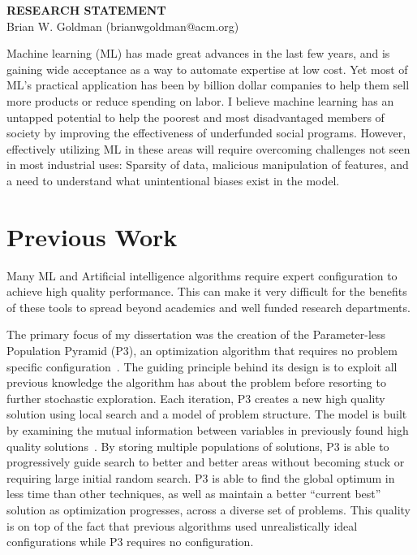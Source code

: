 \documentclass[a4paper, 11pt]{article}
\begin{document}
\thispagestyle{empty}

\pagestyle{fancy}

\begin{center}
{\LARGE \bf RESEARCH STATEMENT}\\
\vspace*{0.1cm}
{\normalsize Brian W. Goldman (brianwgoldman@acm.org)}
\end{center}

\noindent
Machine learning (ML) has made great advances in the last few years, and is gaining wide
acceptance as a way to automate expertise at low cost. Yet most of ML's practical application has
been by billion dollar companies to help them sell more products or reduce spending on labor.
I believe machine learning has an untapped potential to help the poorest and most disadvantaged members
of society by improving the effectiveness of underfunded social programs. However, effectively utilizing
ML in these areas will require overcoming challenges not seen in most industrial uses: Sparsity of data,
malicious manipulation of features, and a need to understand what unintentional biases exist in the model.




\section{Previous Work}
Many ML and Artificial intelligence algorithms require expert configuration
to achieve high quality performance. This can make it very difficult for
the benefits of these tools to spread beyond academics and well funded
research departments.

The primary focus of my dissertation was the creation of the
Parameter-less Population Pyramid (P3), an optimization algorithm
that requires no problem specific configuration~\cite{goldman:2014:p3,goldman:2015:fastp3,goldman:2016:p3hiff}.
The guiding principle behind its design is to exploit all previous
knowledge the algorithm has about the problem before resorting to further stochastic exploration.
Each iteration, P3 creates a new high quality solution using local search and a model of
problem structure. The model is built by examining the mutual information between variables
in previously found high quality solutions~\cite{goldman:2012:ltga}.
By storing multiple populations of solutions, P3 is able to progressively guide search
to better and better areas without becoming stuck or requiring large initial random search.
P3 is able to find the global optimum in less time than other techniques, as well as
maintain a better ``current best'' solution as optimization progresses, across a diverse set of problems.
This quality is on top
of the fact that previous algorithms used unrealistically ideal configurations while
P3 requires no configuration.
\end{document}
